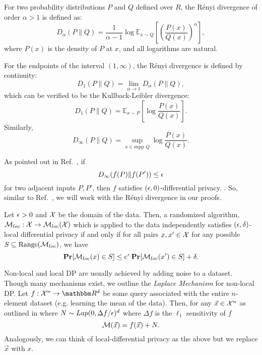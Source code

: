 \begin{definition}
	For two probability distributions \( P \) and \( Q \) defined over \( R \), the Rényi divergence of order \( \alpha > 1 \) is defined as:
	\[
		D_\alpha(P \| Q) =
		\frac{1}{\alpha - 1} \log \mathbb{E}_{x \sim Q} 
		\left[ 
			\left( 
				\frac{P(x)}{Q(x)} 
			\right)^\alpha 
		\right],
	\]
	where \( P(x) \) is the density of \( P \) at \( x \), and all logarithms are natural.

	For the endpoints of the interval \( (1, \infty) \), the Rényi divergence is defined by continuity:
	\[
		D_1(P \| Q) = \lim_{\alpha \to 1} D_\alpha(P \| Q),
	\]
	which can be verified to be the Kullback-Leibler divergence:
	\[
		D_1(P \| Q) = \mathbb{E}_{x \sim P} \left[ \log \frac{P(x)}{Q(x)} \right].
	\]
	Similarly,
	\[
		D_\infty(P \| Q) = \sup_{x \in \text{supp } Q} \log \frac{P(x)}{Q(x)}.
	\]
\end{definition}

As pointed out in Ref.~\cite{mironov2017renyi}, if
\[
	D_\infty(f(P) \| f(P')) \leq \epsilon
\]
for two adjacent inputs $P, P'$, then $f$ satisfies $(\epsilon, 0)$-differential privacy.
.
So, similar to Ref.~\cite{stevens2021efficientdifferentiallyprivatesecure}, we will work with the Rényi divergence in our proofs.



\begin{definition}
	Let $\epsilon > 0$ and $\mathcal{X}$ be the domain of the data.
	Then, a randomized algorithm, $\mathcal{M}_{loc} : \mathcal{X} \rightarrow \mathcal{M}_{loc}(\mathcal{X})$ which is applied to the data independently satisfies $(\epsilon, \delta)$-local differential privacy if and only if for all pairs $x, x' \in \mathcal{X}$
	for any possible $S \subseteq \text{Range}(\mathcal{M}_{loc})$, we have
	\[
		\operatorname*{\mathbf{Pr}}[\mathcal{M}_{loc}(x) \in S] \leq e^\epsilon \operatorname*{\mathbf{Pr}}[\mathcal{M}_{loc}(x') \in S] + \delta.
	\]
\end{definition}

Non-local and local DP are usually achieved by adding noise to a dataset.
Though many mechanisms exist, we outline the \emph{Laplace Mechanism} for non-local DP.
Let $f: \mathcal{X}^n \rightarrow \R^d$ be some query associated with the entire $n$-element dataset (e.g. learning the mean of the data).
Then, for any $\vec{x} \in \mathcal{X}^n$ as outlined in \cite{Bassily_2015} where $N \sim Lap(0, \Delta f/ \epsilon)^{d}$ where $\Delta f$ is the $\ell_1$ sensitivity of $f$
\[
	\mathcal{M}(\vec{x}) = f(\vec{x}) + N.
\]
Analogously, we can think of local-differential privacy as the above but we replace $\vec{x}$ with $x$.

